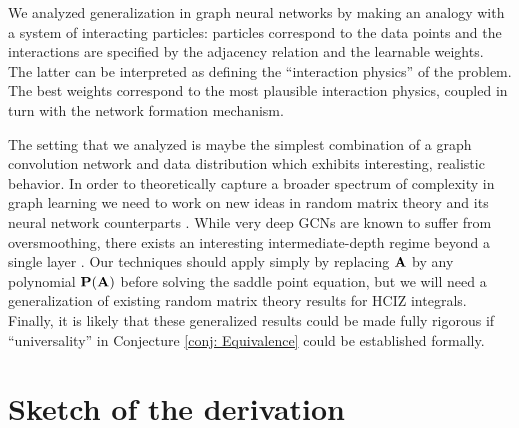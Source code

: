 \documentclass[9pt,twocolumn]{pnas-new}
\begin{document}
We analyzed generalization in graph neural networks by making an analogy with a system of interacting particles: particles correspond to the data points and the interactions are specified by the adjacency relation and the learnable weights. The latter can be interpreted as defining the ``interaction physics'' of the problem. The best weights correspond to the most plausible interaction physics, coupled in turn with the network formation mechanism.

The setting that we analyzed is maybe the simplest combination of a graph convolution network and data distribution which exhibits interesting, realistic behavior. In order to theoretically capture a broader spectrum of complexity in graph learning we need to work on new ideas in random matrix theory and its neural network counterparts \cite{pennington2017nonlinear}. While very deep GCNs are known to suffer from oversmoothing, there exists an interesting intermediate-depth regime beyond a single layer \cite{keriven2022not}. Our techniques should apply simply by replacing $\mathbf{A}$ by any polynomial $\mathbf{P}(\mathbf{A})$ before solving the saddle point equation, but we will need a generalization of existing random matrix theory results for HCIZ integrals. 
Finally, it is likely that these generalized results could be made fully rigorous if  ``universality'' in Conjecture \ref{conj: Equivalence} could be established formally. 




\showacknow{} %






\appendix

\newpage
\onecolumn
\section{Sketch of the derivation}\label{APP: Derivation Sketch}
\end{document}
